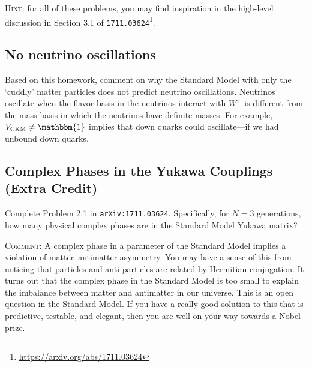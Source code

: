 \documentclass[12pt]{article}
\numberwithin{equation}{section}    %
\begin{document}
\textsc{Hint}: for all of these problems, you may find inspiration in the high-level discussion in Section 3.1 of \texttt{1711.03624}\footnote{\url{https://arxiv.org/abs/1711.03624}}.

\subsection{No neutrino oscillations}

Based on this homework, comment on why the Standard Model with only the `cuddly' matter particles does not predict neutrino oscillations. Neutrinos oscillate when the flavor basis in the neutrinos interact with $W^\pm$ is different from the mass basis in which the neutrinos have definite masses. For example, $V_{\text{CKM}}\neq \mathbbm{1}$ implies that down quarks could oscillate---if we had unbound down quarks.

\subsection{Complex Phases in the Yukawa Couplings (Extra Credit)}

Complete Problem 2.1 in \texttt{arXiv:1711.03624}. Specifically, for $N=3$ generations, how many physical complex phases are in the Standard Model Yukawa matrix? 

\textsc{Comment}: A complex phase in a parameter of the Standard Model implies a violation of matter--antimatter asymmetry. You may have a sense of this from noticing that particles and anti-particles are related by Hermitian conjugation. It turns out that the complex phase in the Standard Model is too small to explain the imbalance between matter and antimatter in our universe. This is an open question in the Standard Model. If you have a really good solution to this that is predictive, testable, and elegant, then you are well on your way towards a Nobel prize.
\end{document}
